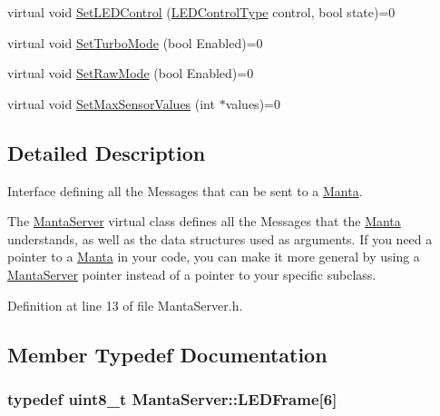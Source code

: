 \begin{DoxyCompactItemize}
\item 
virtual void \hyperlink{classMantaServer_af2b466b8500247e961262c8208c2ad8e}{\-Set\-L\-E\-D\-Control} (\hyperlink{classMantaServer_a4f86e1f91a11c2e3f40765a8166ac1cd}{\-L\-E\-D\-Control\-Type} control, bool state)=0
\item 
virtual void \hyperlink{classMantaServer_a6946dd0d8614b8bb32ef218bfa867cfe}{\-Set\-Turbo\-Mode} (bool \-Enabled)=0
\item 
virtual void \hyperlink{classMantaServer_a60d6de14f77cf8608b0f734421e05e3f}{\-Set\-Raw\-Mode} (bool \-Enabled)=0
\item 
virtual void \hyperlink{classMantaServer_a835960d5e48aafa2e83f05709a8acd2e}{\-Set\-Max\-Sensor\-Values} (int $\ast$values)=0
\end{DoxyCompactItemize}


\subsection{\-Detailed \-Description}
\-Interface defining all the \-Messages that can be sent to a \hyperlink{classManta}{\-Manta}. 

\-The \hyperlink{classMantaServer}{\-Manta\-Server} virtual class defines all the \-Messages that the \hyperlink{classManta}{\-Manta} understands, as well as the data structures used as arguments. \-If you need a pointer to a \hyperlink{classManta}{\-Manta} in your code, you can make it more general by using a \hyperlink{classMantaServer}{\-Manta\-Server} pointer instead of a pointer to your specific subclass. 

\-Definition at line 13 of file \-Manta\-Server.\-h.



\subsection{\-Member \-Typedef \-Documentation}
\hypertarget{classMantaServer_a2ccc3326a971007da61a979a28c4ca98}{
\subsubsection[{\-L\-E\-D\-Frame}]{\setlength{\rightskip}{0pt plus 5cm}typedef uint8\-\_\-t {\bf \-Manta\-Server\-::\-L\-E\-D\-Frame}\mbox{[}6\mbox{]}}}\label{classMantaServer_a2ccc3326a971007da61a979a28c4ca98}


